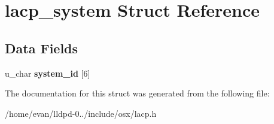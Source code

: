 \section{lacp\-\_\-system \-Struct \-Reference}
\label{structlacp__system}
\subsection*{\-Data \-Fields}
\begin{DoxyCompactItemize}
\item 
u\-\_\-char {\bfseries system\-\_\-id} [6]\label{structlacp__system_ada3f270891540bcbff68b0bdb3732a3b}

\end{DoxyCompactItemize}


\-The documentation for this struct was generated from the following file\-:\begin{DoxyCompactItemize}
\item 
/home/evan/lldpd-\/0../include/osx/lacp.\-h\end{DoxyCompactItemize}
